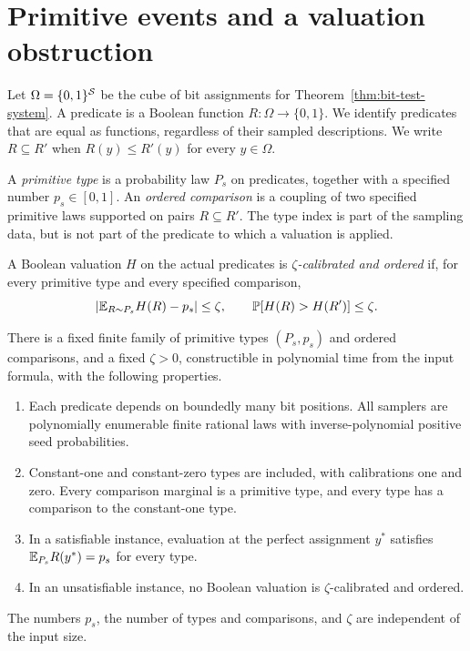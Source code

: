 \section{Primitive events and a valuation obstruction}\label{sec:events}

Let $\Omega=\{0,1\}^{\mathcal S}$ be the cube of bit assignments for
Theorem~\ref{thm:bit-test-system}. A predicate is a Boolean function
$R:\Omega\to\{0,1\}$. We identify predicates that are equal as
functions, regardless of their sampled descriptions. We write
$R\subseteq R'$ when $R(y)\leq R'(y)$ for every $y\in\Omega$.

A \emph{primitive type} is a probability law $P_s$ on predicates,
together with a specified number $p_s\in[0,1]$. An \emph{ordered
comparison} is a coupling of two specified primitive laws supported
on pairs $R\subseteq R'$. The type index is part of the sampling data,
but is not part of the predicate to which a valuation is applied.

\begin{definition}
A Boolean valuation $H$ on the actual predicates is
\emph{$\zeta$-calibrated and ordered} if, for every primitive type
and every specified comparison,
\begin{equation}\label{eq:primitive-calibration-order}
 \lvert\mathbb E_{R\sim P_s}H(R)-p_s\rvert\leq\zeta,
 \qquad
 \mathbb P[H(R)>H(R')]\leq\zeta.
\end{equation}
\end{definition}

\begin{lemma}\label{lem:event-obstruction}
There is a fixed finite family of primitive types $(P_s,p_s)$ and
ordered comparisons, and a fixed $\zeta>0$, constructible in
polynomial time from the input formula, with the following
properties.
\begin{enumerate}[label=\textup{(\roman*)}]
\item Each predicate depends on boundedly many bit positions. All
samplers are polynomially enumerable finite rational laws with
inverse-polynomial positive seed probabilities.
\item Constant-one and constant-zero types are included, with
calibrations one and zero. Every comparison marginal is a primitive
type, and every type has a comparison to the constant-one type.
\item In a satisfiable instance, evaluation at the perfect assignment
$y^*$ satisfies $\mathbb E_{P_s}R(y^*)=p_s$ for every type.
\item In an unsatisfiable instance, no Boolean valuation is
$\zeta$-calibrated and ordered.
\end{enumerate}
The numbers $p_s$, the number of types and comparisons, and $\zeta$
are independent of the input size.
\end{lemma}

